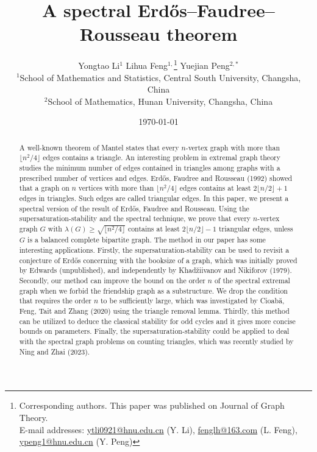 \documentclass[11pt]{article}
\begin{document}
\title{A spectral Erd\H{o}s--Faudree--Rousseau theorem}


\author{Yongtao Li$^{1}$\quad 
 Lihua Feng$^{1,}$\footnote{Corresponding authors. 
This paper was published on  Journal of Graph Theory. \\ 
E-mail addresses:  
\url{ytli0921@hnu.edu.cn} (Y. Li), 
\url{fenglh@163.com} (L. Feng), 
\url{ypeng1@hnu.edu.cn} (Y. Peng)}
\quad
 Yuejian Peng$^{2,*}$  \\
{\small $^{1}$School of Mathematics and Statistics,  Central South University, Changsha, China} \\ 
 {\small $^{2}$School of Mathematics, Hunan University, Changsha, China }  
 }

\date{\today}

 
\maketitle


\vspace{-0.8cm}



\begin{abstract} 
A well-known theorem of Mantel states that every 
$n$-vertex graph with more than $\lfloor n^2/4\rfloor $ edges contains a triangle. An interesting problem in extremal graph theory 
studies the minimum number of edges contained in triangles among
graphs with a prescribed number of vertices and edges. 
 Erd\H{o}s, Faudree and Rousseau (1992) showed that 
a graph on $n$ vertices with more than $\lfloor n^2/4\rfloor $ edges 
contains at least $2\lfloor n/2\rfloor +1$ edges in triangles. 
Such edges are called triangular edges. 
In this paper, we present a spectral version of 
the result of Erd\H{o}s, Faudree and Rousseau. 
Using the supersaturation-stability and the spectral technique, 
we prove that  every $n$-vertex graph 
$G$ with  $\lambda (G) \ge \sqrt{\lfloor n^2/4\rfloor}$ contains at least $2 \lfloor {n}/{2} \rfloor -1$ triangular edges, unless 
$G$ is a balanced complete bipartite graph. 
The method in our paper has some interesting applications. 
Firstly, the supersaturation-stability can be used to revisit  a conjecture of Erd\H{o}s concerning with the booksize of a graph, which was initially proved by Edwards (unpublished), and independently by Khad\v{z}iivanov and Nikiforov (1979). 
Secondly, our method can improve the bound on the order $n$ of the spectral extremal graph when we forbid the friendship graph as a substructure. We drop the condition that requires the order $n$ to be sufficiently large, which was investigated by Cioab\u{a}, Feng, Tait and Zhang (2020) using the triangle removal lemma. 
Thirdly, this method can be utilized to deduce the classical stability 
for odd cycles and it gives more concise bounds on parameters. 
Finally, the supersaturation-stability could be applied to 
deal with the spectral graph problems on counting triangles, 
which was recently studied by Ning and Zhai (2023). 
 \end{abstract}
 
\end{document}
